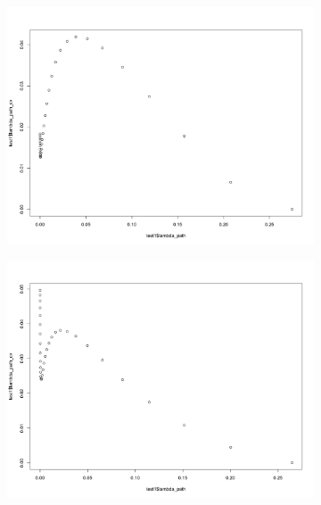 \documentclass[letterpaper]{article}
\begin{document}
\begin{figure}[H]
\centering
\begin{subfigure}{0.5\textwidth}
  \centering
  \includegraphics[width=1\linewidth]{./result_plot/ll_use_k/3wrong_path_plot}
\end{subfigure}%
\begin{subfigure}{.5\textwidth}
  \centering
  \includegraphics[width=1\linewidth]{./result_plot/ll_use_k/4wrong_path_plot}
\end{subfigure}

\end{figure}
\end{document}
